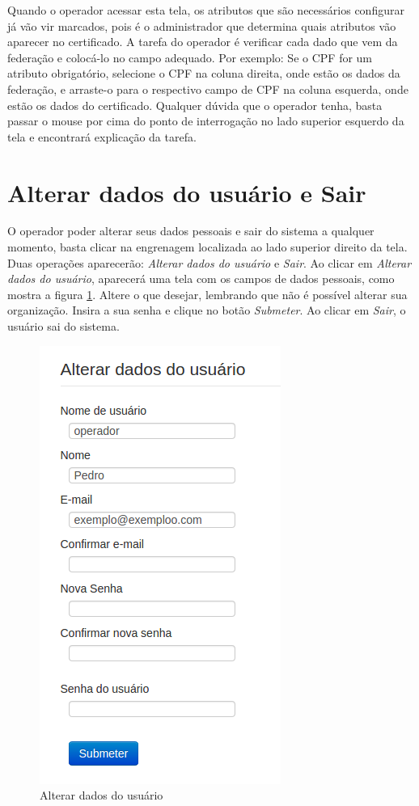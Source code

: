 Quando o operador acessar esta tela, os atributos que são necessários configurar já vão vir marcados, pois é o administrador que determina quais atributos vão aparecer no certificado. A tarefa do operador é verificar cada dado que vem da federação e colocá-lo no campo adequado. Por exemplo: Se o CPF for um atributo obrigatório, selecione o CPF na coluna direita, onde estão os dados da federação, e arraste-o para o respectivo campo de CPF na coluna esquerda, onde estão os dados do certificado. Qualquer dúvida que o operador tenha, basta passar o mouse por cima do ponto de interrogação no lado superior esquerdo da tela e encontrará explicação da tarefa. 

\section{Alterar dados do usuário e Sair}

O operador poder alterar seus dados pessoais e sair do sistema a qualquer momento, basta clicar na engrenagem localizada ao lado superior direito da tela. Duas operações aparecerão: \textit{Alterar dados do usuário} e \textit{Sair}. Ao clicar em \textit{Alterar dados do usuário}, aparecerá uma tela com os campos de dados pessoais, como mostra a figura \ref{fig:alterarop}. Altere o que desejar, lembrando que não é possível alterar sua organização. Insira a sua senha e clique no botão \emph{Submeter}. Ao clicar em \textit{Sair}, o usuário sai do sistema.

\begin{figure}[ht]
    \centering
     \includegraphics[scale=0.7]{images/alterardadosop.png}
     \caption{Alterar dados do usuário}
     \label{fig:alterarop}
\end{figure}